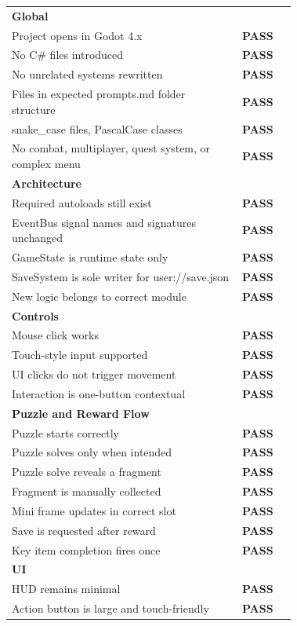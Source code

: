 \documentclass[12pt, a4paper]{article}
\newcommand{\statuspass}{\textcolor{passgre}{\textbf{PASS}}}
\begin{document}
\begin{center}
\begin{longtable}{p{0.60\linewidth} p{0.12\linewidth}}
\multicolumn{2}{l}{\textbf{Global}} \\
Project opens in Godot 4.x & \statuspass \\
No C\# files introduced & \statuspass \\
No unrelated systems rewritten & \statuspass \\
Files in expected prompts.md folder structure & \statuspass \\
snake\_case files, PascalCase classes & \statuspass \\
No combat, multiplayer, quest system, or complex menu & \statuspass \\
\midrule
\multicolumn{2}{l}{\textbf{Architecture}} \\
Required autoloads still exist & \statuspass \\
EventBus signal names and signatures unchanged & \statuspass \\
GameState is runtime state only & \statuspass \\
SaveSystem is sole writer for user://save.json & \statuspass \\
New logic belongs to correct module & \statuspass \\
\midrule
\multicolumn{2}{l}{\textbf{Controls}} \\
Mouse click works & \statuspass \\
Touch-style input supported & \statuspass \\
UI clicks do not trigger movement & \statuspass \\
Interaction is one-button contextual & \statuspass \\
\midrule
\multicolumn{2}{l}{\textbf{Puzzle and Reward Flow}} \\
Puzzle starts correctly & \statuspass \\
Puzzle solves only when intended & \statuspass \\
Puzzle solve reveals a fragment & \statuspass \\
Fragment is manually collected & \statuspass \\
Mini frame updates in correct slot & \statuspass \\
Save is requested after reward & \statuspass \\
Key item completion fires once & \statuspass \\
\midrule
\multicolumn{2}{l}{\textbf{UI}} \\
HUD remains minimal & \statuspass \\
Action button is large and touch-friendly & \statuspass \\

\end{longtable}
\end{center}
\end{document}
